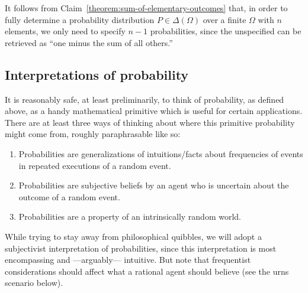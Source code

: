 \documentclass[nobib,nofonts]{tufte-handout}
\begin{document}
It follows from Claim~\ref{theorem:sum-of-elementary-outcomes} that, in order to fully determine a probability distribution $P \in \Delta(\Omega)$ over a finite $\Omega$ with $n$ elements, we only need to specify $n-1$ probabilities, since the unspecified can be retrieved as ``one minus the sum of all others.''

\subsection{Interpretations of probability}

It is reasonably safe, at least preliminarily, to think of probability, as defined above, as a
handy mathematical primitive which is useful for certain applications. There are at least three
ways of thinking about where this primitive probability might come from, roughly paraphrasable
like so:
\begin{enumerate}[1.]
\item {} Probabilities are generalizations of intuitions/facts about frequencies of events in
  repeated executions of a random event.
\item {} Probabilities are subjective beliefs by an agent who is
  uncertain about the outcome of a random event.
\item {} Probabilities are a property of an intrinsically random world.
\end{enumerate}

While trying to stay away from philosophical quibbles, we will adopt a subjectivist interpretation of probabilities, since this interpretation is most encompassing and ---arguably--- intuitive.
But note that frequentist considerations should affect what a rational agent should believe (see the urns scenario below).
\end{document}
